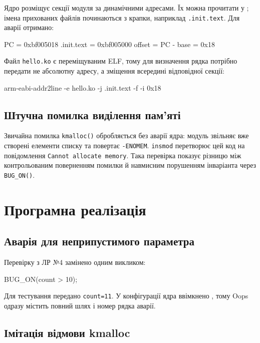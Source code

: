 \documentclass[12pt,a4paper]{article}
\begin{document}
Ядро розміщує секції модуля за динамічними адресами. Їх можна прочитати у
; імена прихованих файлів починаються з
крапки, наприклад \texttt{.init.text}. Для аварії отримано:

\begin{code}
PC = 0xbf005018
.init.text = 0xbf005000
offset = PC - base = 0x18
\end{code}

Файл \texttt{hello.ko} є переміщуваним ELF, тому для визначення рядка
потрібно передати не абсолютну адресу, а зміщення всередині відповідної
секції:

\begin{code}
arm-eabi-addr2line -e hello.ko -j .init.text -f -i 0x18
\end{code}

\subsection{Штучна помилка виділення пам'яті}

Звичайна помилка \texttt{kmalloc()} обробляється без аварії ядра: модуль
звільняє вже створені елементи списку та повертає \texttt{-ENOMEM}.
\texttt{insmod} перетворює цей код на повідомлення
\texttt{Cannot allocate memory}. Така перевірка показує різницю між
контрольованим поверненням помилки й навмисним порушенням інваріанта через
\texttt{BUG\_ON()}.

\section{Програмна реалізація}

\subsection{Аварія для неприпустимого параметра}

Перевірку з ЛР №4 замінено одним викликом:

\begin{code}
BUG_ON(count > 10);
\end{code}

Для тестування передано \texttt{count=11}. У конфігурації ядра ввімкнено
, тому Oops одразу містить повний шлях і
номер рядка аварії.

\subsection{Імітація відмови kmalloc}
\end{document}
